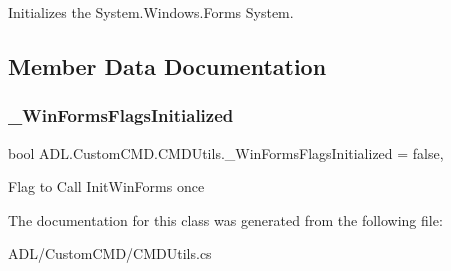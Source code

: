 Initializes the System.\+Windows.\+Forms System. 



\subsection{Member Data Documentation}
\mbox{\label{class_a_d_l_1_1_custom_c_m_d_1_1_c_m_d_utils_a146849b04a89ae31e86ae3fe959e98f5}} 
\subsubsection{\texorpdfstring{\+\_\+\+Win\+Forms\+Flags\+Initialized}{\_WinFormsFlagsInitialized}}
{\footnotesize\ttfamily bool A\+D\+L.\+Custom\+C\+M\+D.\+C\+M\+D\+Utils.\+\_\+\+Win\+Forms\+Flags\+Initialized = false\hspace{0.3cm}{\ttfamily [static]}, {\ttfamily [private]}}



Flag to Call Init\+Win\+Forms once 



The documentation for this class was generated from the following file\+:\begin{DoxyCompactItemize}
\item 
A\+D\+L/\+Custom\+C\+M\+D/C\+M\+D\+Utils.\+cs\end{DoxyCompactItemize}
